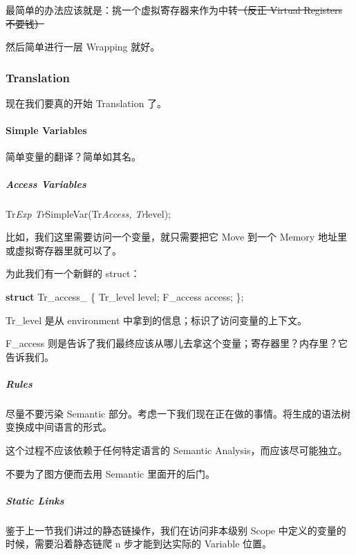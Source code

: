 \documentclass[
]{article}
\newenvironment{Shaded}{}{}
\newcommand{\KeywordTok}[1]{\textcolor[rgb]{0.00,0.44,0.13}{\textbf{#1}}}
\newcommand{\NormalTok}[1]{#1}
\begin{document}
最简单的办法应该就是：挑一个虚拟寄存器来作为中转\sout{（反正 Virtual
Registers 不要钱）}

然后简单进行一层 Wrapping 就好。

\hypertarget{header-n105}{%
\subsubsection{Translation}\label{header-n105}}

现在我们要真的开始 Translation 了。

\hypertarget{header-n107}{%
\paragraph{Simple Variables}\label{header-n107}}

简单变量的翻译？简单如其名。

\hypertarget{header-n109}{%
\subparagraph{Access Variables}\label{header-n109}}

Tr\emph{Exp Tr}SimpleVar(Tr\emph{Access, Tr}level);

比如，我们这里需要访问一个变量，就只需要把它 Move 到一个 Memory
地址里或虚拟寄存器里就可以了。

为此我们有一个新鲜的 struct：

\begin{Shaded}
\begin{Highlighting}[]
\KeywordTok{struct}\NormalTok{ Tr_access_ \{}
\NormalTok{	Tr_level level;}
\NormalTok{    F_access access;}
\NormalTok{\};}
\end{Highlighting}
\end{Shaded}

Tr\_level 是从 environment 中拿到的信息；标识了访问变量的上下文。

F\_access
则是告诉了我们最终应该从哪儿去拿这个变量；寄存器里？内存里？它告诉我们。

\hypertarget{header-n116}{%
\subparagraph{Rules}\label{header-n116}}

尽量不要污染 Semantic
部分。考虑一下我们现在正在做的事情。将生成的语法树变换成中间语言的形式。

这个过程不应该依赖于任何特定语言的 Semantic Analysis，而应该尽可能独立。

不要为了图方便而去用 Semantic 里面开的后门。

\hypertarget{header-n120}{%
\subparagraph{Static Links}\label{header-n120}}

鉴于上一节我们讲过的静态链操作，我们在访问非本级别 Scope
中定义的变量的时候，需要沿着静态链爬 n 步才能到达实际的 Variable 位置。
\end{document}
